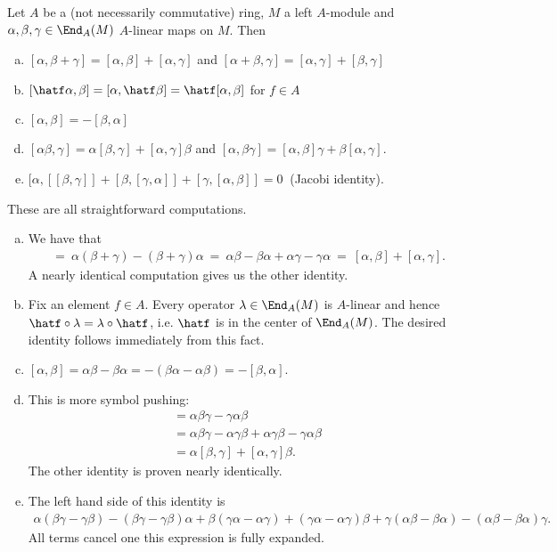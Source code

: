 \begin{prop}\label{prop:commutator-relations}
	Let $A$ be a (not necessarily commutative) ring, $M$ a left $A$-module and $\alpha,\beta,\gamma \in \End_A(M)$ $A$-linear maps on $M$. Then
	\begin{enumerate}[(a)]
		\item $[\alpha,\beta + \gamma] = [\alpha,\beta] + [\alpha, \gamma]$ and $[\alpha + \beta, \gamma] = [\alpha, \gamma] + [\beta,\gamma]$
		\item $[\hatf\alpha,\beta] = [\alpha,\hatf\beta] = \hatf[\alpha,\beta]$ for $f \in A$
		\item $[\alpha,\beta] = -[\beta,\alpha]$
		\item $[\alpha\beta,\gamma] = \alpha[\beta,\gamma] + [\alpha,\gamma]\beta$ and $[\alpha,\beta\gamma] = [\alpha,\beta]\gamma + \beta[\alpha,\gamma]$.
		\item $[\alpha,[[\beta,\gamma]] + [\beta,[\gamma,\alpha]] + [\gamma,[\alpha,\beta]] = 0~$ \hspace{0.5em}(Jacobi identity).
	\end{enumerate}
\end{prop}
\begin{prf}
	These are all straightforward computations.
	\begin{enumerate}[(a)]
		\item We have that
			\begin{align*}
				[\alpha,\beta+\gamma] 
				  &~=~ \alpha(\beta+\gamma) - (\beta+\gamma)\alpha
				  ~=~ \alpha\beta - \beta\alpha + \alpha\gamma - \gamma\alpha
				  ~=~ [\alpha,\beta] + [\alpha,\gamma].
			\end{align*}
			A nearly identical computation gives us the other identity.
		\item Fix an element $f \in A$. Every operator $\lambda \in \End_A(M)$ is $A$-linear and hence $\hatf\circ\lambda = \lambda\circ \hatf$, i.e. $\hatf$ is in the center of $\End_A(M)$. The desired identity follows immediately from this fact.
		\item $[\alpha,\beta] = \alpha\beta - \beta\alpha = -(\beta\alpha - \alpha\beta) = -[\beta,\alpha]$. 
		\item This is more symbol pushing:
			\begin{align*}
				[\alpha\beta,\gamma] 
				  &= \alpha\beta\gamma - \gamma\alpha\beta \\
				  &= \alpha \beta\gamma - \alpha\gamma\beta + \alpha\gamma\beta - \gamma\alpha\beta \\
				  &= \alpha[\beta,\gamma] + [\alpha,\gamma]\beta.
			\end{align*}
			The other identity is proven nearly identically.
		\item The left hand side of this identity is
			\begin{align*}
				\alpha(\beta\gamma - \gamma\beta) - (\beta\gamma - \gamma\beta)\alpha + \beta(\gamma\alpha - \alpha\gamma) + (\gamma\alpha - \alpha\gamma)\beta + \gamma(\alpha\beta - \beta\alpha) - (\alpha\beta-\beta\alpha)\gamma.
			\end{align*}
			All terms cancel one this expression is fully expanded.
	\end{enumerate}
\end{prf}

